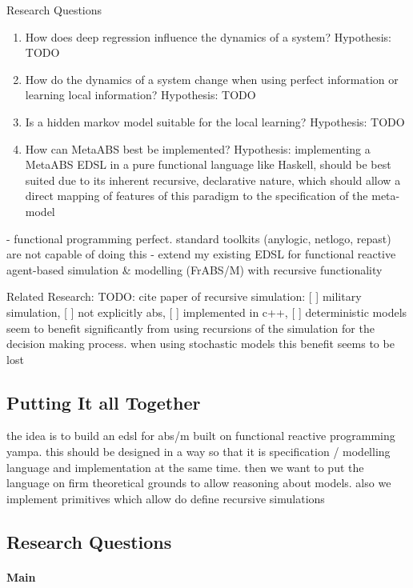 Research Questions
\begin{enumerate}
	\item How does deep regression influence the dynamics of a system? Hypothesis: TODO
	\item How do the dynamics of a system change when using perfect information or learning local information? Hypothesis: TODO
	\item Is a hidden markov model suitable for the local learning? Hypothesis: TODO
	\item How can MetaABS best be implemented? Hypothesis: implementing a MetaABS EDSL in a pure functional language like Haskell, should be best suited due to its inherent recursive, declarative nature, which should allow a direct mapping of features of this paradigm to the specification of the meta-model
\end{enumerate}

- functional programming perfect. standard toolkits (anylogic, netlogo, repast) are not capable of doing this
- extend my existing EDSL for functional reactive agent-based simulation \& modelling (FrABS/M) with recursive functionality
 
Related Research:
TODO: \cite{gilmer_recursive_2000} cite paper of recursive simulation: [ ] military simulation, [ ] not explicitly abs, [ ] implemented in c++, [ ] deterministic models seem to benefit significantly from using recursions of the simulation for the decision making process. when using stochastic models this benefit seems to be lost

\subsection{Putting It all Together}
the idea is to build an edsl for abs/m built on functional reactive programming yampa. this should be designed in a way so that it is specification / modelling language and implementation at the same time. then we want to put the language on firm theoretical grounds to allow reasoning about models. also we implement primitives which allow do define recursive simulations

\subsection{Research Questions}
\paragraph{Main} 